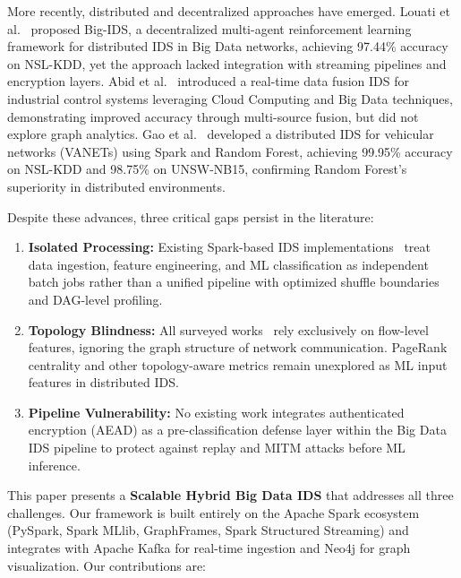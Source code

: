 \documentclass[conference]{IEEEtran}
\begin{document}
More recently, distributed and decentralized approaches have emerged. Louati et al.~\cite{b8} proposed Big-IDS, a decentralized multi-agent reinforcement learning framework for distributed IDS in Big Data networks, achieving 97.44\% accuracy on NSL-KDD, yet the approach lacked integration with streaming pipelines and encryption layers. Abid et al.~\cite{b9} introduced a real-time data fusion IDS for industrial control systems leveraging Cloud Computing and Big Data techniques, demonstrating improved accuracy through multi-source fusion, but did not explore graph analytics. Gao et al.~\cite{b10} developed a distributed IDS for vehicular networks (VANETs) using Spark and Random Forest, achieving 99.95\% accuracy on NSL-KDD and 98.75\% on UNSW-NB15, confirming Random Forest's superiority in distributed environments.

Despite these advances, three critical gaps persist in the literature:

\begin{enumerate}
    \item \textbf{Isolated Processing:} Existing Spark-based IDS implementations~\cite{b2,b3,b4} treat data ingestion, feature engineering, and ML classification as independent batch jobs rather than a unified pipeline with optimized shuffle boundaries and DAG-level profiling.
    
    \item \textbf{Topology Blindness:} All surveyed works~\cite{b2,b3,b5,b6,b7,b8,b10} rely exclusively on flow-level features, ignoring the graph structure of network communication. PageRank centrality and other topology-aware metrics remain unexplored as ML input features in distributed IDS.
    
    \item \textbf{Pipeline Vulnerability:} No existing work integrates authenticated encryption (AEAD) as a pre-classification defense layer within the Big Data IDS pipeline to protect against replay and MITM attacks before ML inference.
\end{enumerate}

This paper presents a \textbf{Scalable Hybrid Big Data IDS} that addresses all three challenges. Our framework is built entirely on the Apache Spark ecosystem (PySpark, Spark MLlib, GraphFrames, Spark Structured Streaming) and integrates with Apache Kafka for real-time ingestion and Neo4j for graph visualization. Our contributions are:
\end{document}
